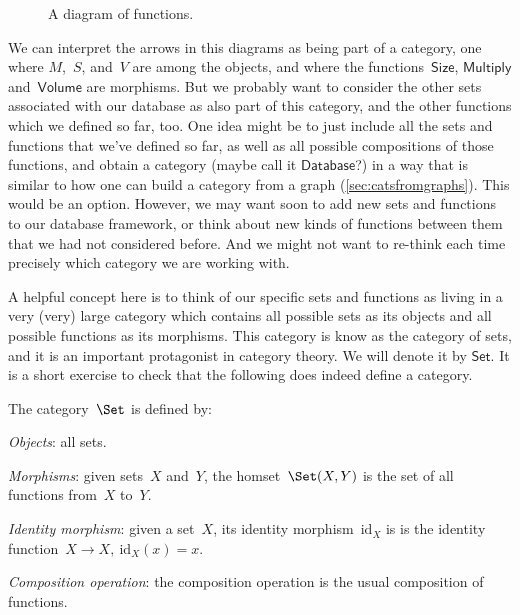\begin{figure}[h!]
\begin{center}
\end{center}
\caption{A diagram of functions. \label{fig:diagram_functions}}
\end{figure}

We can interpret the arrows in this diagrams as being part of a category, one where $M$,~$S$, and~$V$ are among the objects, and where the functions~$\mathsf{Size}$, $\mathsf{Multiply}$ and~$\mathsf{Volume}$ are morphisms. But we probably want to consider the other sets associated with our database as also part of this category, and the other functions which we defined so far, too. One idea might be to just include all the sets and functions that we've defined so far, as well as all possible compositions of those functions, and obtain a category (maybe call it $\mathsf{Database}$?) in a way that is similar to how one can build a category from a graph (\cref{sec:catsfromgraphs}). This would be an option. However, we may want soon to add new sets and functions to our database framework, or think about new kinds of functions between them that we had not considered before. And we might not want to re-think each time precisely which category we are working with.

A helpful concept here is to think of our specific sets and functions as living in a very (very) large category which contains all possible sets as its objects and all possible functions as its morphisms. This category is know as the category of sets, and it is an important protagonist in category theory. We will denote it by $\mathsf{Set}$. It is a short exercise to check that the following does indeed define a category. 

\begin{shaded}
\begin{definition}
The category~$\Set$ is defined by:
    \begin{compactenum}
    \item \emph{Objects}: all sets.
    \item \emph{Morphisms}: given sets~$X$ and~$Y$, the homset~$\Set(X,Y)$ is the set of all functions from~$X$ to~$Y$.
    \item \emph{Identity morphism}: given a set~$X$, its identity morphism~$\text{id}_X$ is
    is the identity function~$X \to X, \ \text{id}_X(x) = x$.
    \item \emph{Composition operation}: the composition operation is the usual composition of functions.
    \end{compactenum}
\end{definition}
\end{shaded}

